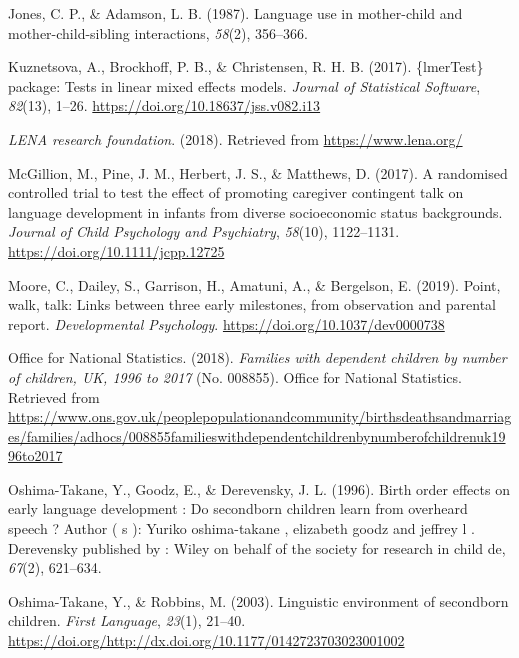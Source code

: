 \documentclass[
  english,
  man,floatsintext]{apa6}
\begin{document}
\leavevmode\hypertarget{ref-jones_language_1987}{}%
Jones, C. P., \& Adamson, L. B. (1987). Language use in mother-child and mother-child-sibling interactions, \emph{58}(2), 356--366.

\leavevmode\hypertarget{ref-kuznetsova_lmertest_2017}{}%
Kuznetsova, A., Brockhoff, P. B., \& Christensen, R. H. B. (2017). \{lmerTest\} package: Tests in linear mixed effects models. \emph{Journal of Statistical Software}, \emph{82}(13), 1--26. \url{https://doi.org/10.18637/jss.v082.i13}

\leavevmode\hypertarget{ref-noauthor_lena_2018}{}%
\emph{LENA research foundation}. (2018). Retrieved from \url{https://www.lena.org/}

\leavevmode\hypertarget{ref-mcgillion_randomised_2017}{}%
McGillion, M., Pine, J. M., Herbert, J. S., \& Matthews, D. (2017). A randomised controlled trial to test the effect of promoting caregiver contingent talk on language development in infants from diverse socioeconomic status backgrounds. \emph{Journal of Child Psychology and Psychiatry}, \emph{58}(10), 1122--1131. \url{https://doi.org/10.1111/jcpp.12725}

\leavevmode\hypertarget{ref-moore_point_2019}{}%
Moore, C., Dailey, S., Garrison, H., Amatuni, A., \& Bergelson, E. (2019). Point, walk, talk: Links between three early milestones, from observation and parental report. \emph{Developmental Psychology}. \url{https://doi.org/10.1037/dev0000738}

\leavevmode\hypertarget{ref-office_for_national_statistics_families_2018}{}%
Office for National Statistics. (2018). \emph{Families with dependent children by number of children, UK, 1996 to 2017} (No. 008855). Office for National Statistics. Retrieved from \url{https://www.ons.gov.uk/peoplepopulationandcommunity/birthsdeathsandmarriages/families/adhocs/008855familieswithdependentchildrenbynumberofchildrenuk1996to2017}

\leavevmode\hypertarget{ref-oshima-takane_birth_1996}{}%
Oshima-Takane, Y., Goodz, E., \& Derevensky, J. L. (1996). Birth order effects on early language development : Do secondborn children learn from overheard speech ? Author ( s ): Yuriko oshima-takane , elizabeth goodz and jeffrey l . Derevensky published by : Wiley on behalf of the society for research in child de, \emph{67}(2), 621--634.

\leavevmode\hypertarget{ref-oshima-takane_linguistic_2003}{}%
Oshima-Takane, Y., \& Robbins, M. (2003). Linguistic environment of secondborn children. \emph{First Language}, \emph{23}(1), 21--40. \url{https://doi.org/http://dx.doi.org/10.1177/0142723703023001002}
\end{document}
